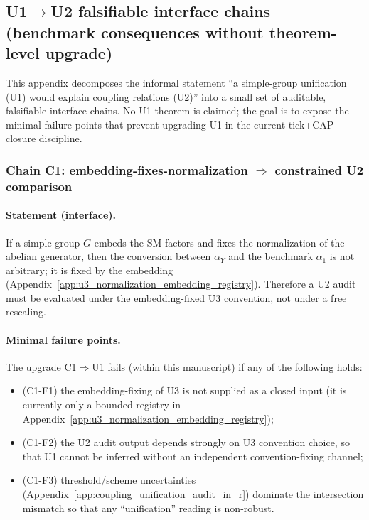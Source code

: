 \subsection{U1$\to$U2 falsifiable interface chains (benchmark consequences without theorem-level upgrade)}
\label{app:u1_to_u2_falsifiable_interface_chains}

This appendix decomposes the informal statement ``a simple-group unification (U1) would explain coupling relations (U2)'' into a small set of auditable, falsifiable interface chains.
No U1 theorem is claimed; the goal is to expose the minimal failure points that prevent upgrading U1 in the current tick+CAP closure discipline.

\subsubsection{Chain C1: embedding-fixes-normalization $\Rightarrow$ constrained U2 comparison}
\paragraph{Statement (interface).}
\InterfaceTag If a simple group $G$ embeds the SM factors and fixes the normalization of the abelian generator, then the conversion between $\alpha_Y$ and the benchmark $\alpha_1$ is not arbitrary; it is fixed by the embedding (Appendix~\ref{app:u3_normalization_embedding_registry}).
Therefore a U2 audit must be evaluated under the embedding-fixed U3 convention, not under a free rescaling.

\paragraph{Minimal failure points.}
\AuditTag The upgrade C1$\Rightarrow$U1 fails (within this manuscript) if any of the following holds:
\begin{itemize}
\item (C1-F1) the embedding-fixing of U3 is not supplied as a closed input (it is currently only a bounded registry in Appendix~\ref{app:u3_normalization_embedding_registry});
\item (C1-F2) the U2 audit output depends strongly on U3 convention choice, so that U1 cannot be inferred without an independent convention-fixing channel;
\item (C1-F3) threshold/scheme uncertainties (Appendix~\ref{app:coupling_unification_audit_in_r}) dominate the intersection mismatch so that any ``unification'' reading is non-robust.
\end{itemize}

